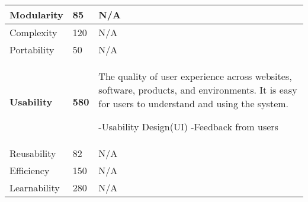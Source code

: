 \begin{center}
\begin{tabular}{| l | l | p{6cm} |}
			Modularity & 85 & N\slash A \\ \hline
			
			Complexity & 120 & N\slash A \\ \hline
			
			Portability & 50 & N\slash A \\ \hline
			
			\textbf{Usability} & \textbf{580} & The quality of user experience across websites, software, products, and environments. It is easy for users to understand and using the system.

			-Usability Design(UI)
			-Feedback from users \\ \hline
			
			Reusability & 82 & N\slash A \\ \hline
			
			Efficiency & 150 & N\slash A \\ \hline
			
			Learnability & 280 & N\slash A \\ 
			
   		 \hline
	\end{tabular}
\end{center}